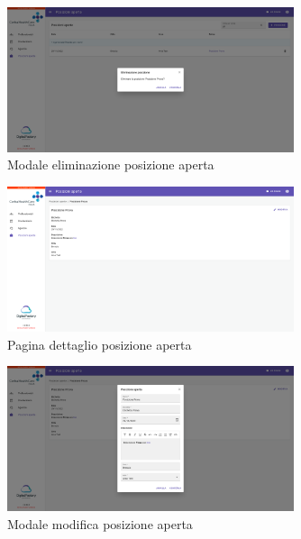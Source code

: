 \begin{figure}[H]
    \centering
    \includegraphics[width=0.75\textwidth]{images/capitolo5/f10_jobOpenPositions/ModalJobOpenPosition_delete.png} 
    \caption{Modale eliminazione posizione aperta} 
    \label{fig:ModalJobOpenPosition_delete}
\end{figure}

\begin{figure}[H]
    \centering
    \includegraphics[width=0.75\textwidth]{images/capitolo5/f10_jobOpenPositions/PageJobOpenPosition.png} 
    \caption{Pagina dettaglio posizione aperta} 
    \label{fig:PageJobOpenPosition}
\end{figure}

\begin{figure}[H]
    \centering
    \includegraphics[width=0.75\textwidth]{images/capitolo5/f10_jobOpenPositions/ModalJobOpenPosition_edit.png} 
    \caption{Modale modifica posizione aperta} 
    \label{fig:ModalJobOpenPosition_edit}
\end{figure}


